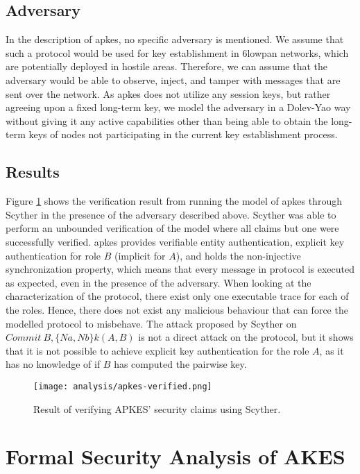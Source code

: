 \subsection{Adversary}

In the description of \gls{apkes}, no specific adversary is mentioned. We assume that such a protocol would be used for key establishment in \gls{6lowpan} networks, which are potentially deployed in hostile areas. Therefore, we can assume that the adversary would be able to observe, inject, and tamper with messages that are sent over the network. As \gls{apkes} does not utilize any session keys, but rather agreeing upon a fixed long-term key, we model the adversary in a Dolev-Yao way without giving it any active capabilities other than being able to obtain the long-term keys of nodes not participating in the current key establishment process. 

\subsection{Results}

Figure \ref{fig:apkes-verified} shows the verification result from running the model of \gls{apkes} through Scyther in the presence of the adversary described above. Scyther was able to perform an unbounded verification of the model where all claims but one were successfully verified. \gls{apkes} provides verifiable entity authentication, explicit key authentication for role $B$ (implicit for $A$), and holds the non-injective synchronization property, which means that every message in protocol is executed as expected, even in the presence of the adversary. When looking at the characterization of the protocol, there exist only one executable trace for each of the roles. Hence, there does not exist any malicious behaviour that can force the modelled protocol to misbehave. The attack proposed by Scyther on $Commit\ B, \{Na, Nb\}k(A,B)$ is not a direct attack on the protocol, but it shows that it is not possible to achieve explicit key authentication for the role $A$, as it has no knowledge of if $B$ has computed the pairwise key. 


\begin{figure}[h]
	\centering
	\texttt{[image: analysis/apkes-verified.png]}
	\caption{Result of verifying APKES' security claims using Scyther.}
	\label{fig:apkes-verified}
\end{figure}



\section{Formal Security Analysis of AKES}
\label{sec:akes-analysis}


